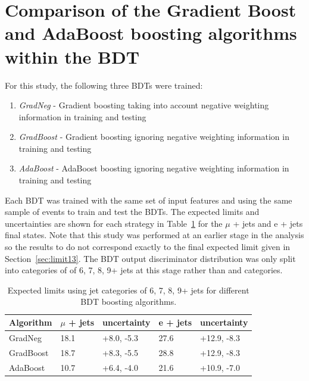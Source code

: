 \section{Comparison of the Gradient Boost and AdaBoost boosting algorithms within the BDT \label{app:adagrad}}

For this study, the following three BDTs were trained:
\begin{enumerate}
\item \emph{GradNeg} - Gradient boosting taking into account negative weighting information in training and testing
\item \emph{GradBoost} - Gradient boosting ignoring negative weighting information in training and testing
\item \emph{AdaBoost} - AdaBoost boosting ignoring negative weighting information in training and testing
\end{enumerate}
%
Each BDT was trained with the same set of input features and using the same sample of events to train and test the BDTs. The expected limits and uncertainties are shown for each strategy in Table~\ref{tab:BDTalgos} for the $\mu$ + jets and e + jets final states. Note that this study was performed at an earlier stage in the analysis so the results to do not correspond exactly to the final expected limit given in Section~\ref{sec:limit13}. The BDT output discriminator distribution was only split into \njets categories of of 6, 7, 8, 9+ jets at this stage rather than \njets and \nMtags categories.



\begin{table}[ht]
\centering
\caption{Expected limits using jet categories of 6, 7, 8, 9+ jets for different BDT boosting algorithms.}
\label{tab:BDTalgos}
\begin{tabular}{|l|l|l|l|l|}
\hline
Algorithm & $\mu$ + jets & uncertainty & e + jets & uncertainty \\ \hline
GradNeg   & 18.1         & +8.0, -5.3  & 27.6     & +12.9, -8.3 \\ \hline
GradBoost & 18.7         & +8.3, -5.5  & 28.8     & +12.9, -8.3 \\ \hline
AdaBoost  & 10.7         & +6.4, -4.0  & 21.6     & +10.9, -7.0 \\ \hline
\end{tabular}
\end{table}


